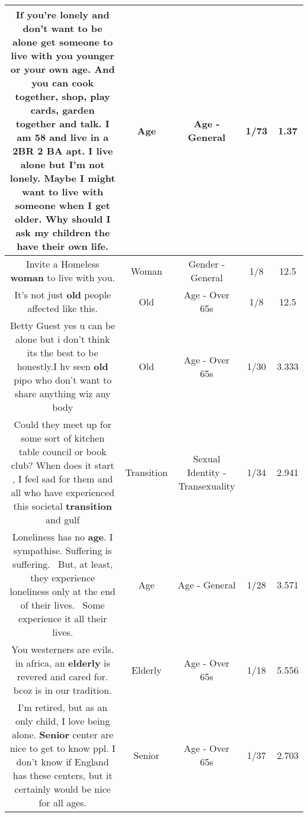 \documentclass[11pt]{article}
\newlength\mylength
\begin{document}
\begin{center}
\begin{longtable}{|C{.65\mylength}|C{.30\mylength}|C{.12\mylength}|C{.12\mylength}|C{.12\mylength}|}
  \small If you're lonely and don't want to be alone get someone to live with you younger or your own \textbf{age}. And you can cook together, shop, play cards, garden together and talk. I am 58 and live in a 2BR 2 BA apt. I live alone but I'm not lonely. Maybe I might want to live with someone when I get older. Why should I ask my children the have their own life.\normalsize   & Age & Age - General & 1/73 & 1.37 \\  \hline
  \small Invite a Homeless \textbf{woman} to live with you.\normalsize   & Woman & Gender - General & 1/8 & 12.5 \\  \hline
  \small It's not just \textbf{old} people affected like this.\normalsize   & Old & Age - Over 65s & 1/8 & 12.5 \\  \hline
  \small Betty Guest yes u can be alone but i don't think its the best to be honestly.I hv seen \textbf{old} pipo who don't want to share anything wiz any body\normalsize   & Old & Age - Over 65s & 1/30 & 3.333 \\  \hline
  \small Could they meet up for some sort of kitchen table council or book club? When does it start , I feel sad for them and all who have experienced this societal \textbf{transition} and gulf\normalsize   & Transition & Sexual Identity - Transexuality & 1/34 & 2.941 \\  \hline
  \small Loneliness has no \textbf{age}. I sympathise. Suffering is suffering.  But, at least, they experience loneliness only at the end of their lives.  Some experience it all their lives.\normalsize   & Age & Age - General & 1/28 & 3.571 \\  \hline
  \small You westerners are evils. in africa, an \textbf{elderly}  is  revered and cared for.  bcoz is in our tradition.\normalsize   & Elderly & Age - Over 65s & 1/18 & 5.556 \\  \hline
  \small I'm retired, but as an only child, I love being alone. \textbf{Senior} center are nice to get to know ppl. I don't know if England has these centers, but it certainly would be nice for all ages.\normalsize   & Senior & Age - Over 65s & 1/37 & 2.703 \\  \hline

\end{longtable}
\end{center}
\end{document}
